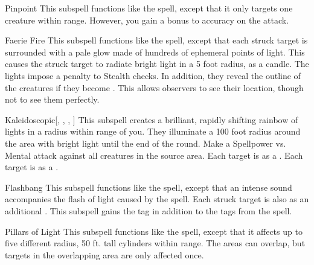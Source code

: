\begin{ability}[\nth{2}]{Pinpoint}
This subspell functions like the  spell, except that it only targets one creature within \rngmed range.
However, you gain a  bonus to accuracy on the attack.
\end{ability}
\vspace{0.25em}


\begin{ability}[\nth{3}]{Faerie Fire}
This subspell functions like the  spell, except that each struck target is surrounded with a pale glow made of hundreds of ephemeral points of light.
This causes the struck target to radiate bright light in a 5 foot radius, as a candle.
The lights impose a  penalty to Stealth checks.
In addition, they reveal the outline of the creatures if they become .
This allows observers to see their location, though not to see them perfectly.
\end{ability}
\vspace{0.25em}


\begin{ability}[\nth{3}]{Kaleidoscopic}[, , , ]
This subspell creates a brilliant, rapidly shifting rainbow of lights in a \areasmall radius within \rngmed range of you.
They illuminate a 100 foot radius around the area with bright light until the end of the round.
Make a Spellpower vs. Mental attack against all creatures in the source area.
\hit Each target is \disoriented as a .
\crit Each target is \confused as a .
\end{ability}
\vspace{0.25em}


\begin{ability}[\nth{4}]{Flashbang}
This subspell functions like the  spell, except that an intense sound accompanies the flash of light caused by the spell.
Each struck target is also  as an additional .
This subspell gains the  tag in addition to the tags from the  spell.
\end{ability}
\vspace{0.25em}


\begin{ability}[\nth{4}]{Pillars of Light}
This subspell functions like the  spell, except that it affects up to five different \areasmall radius, 50 ft. tall cylinders within range.
The areas can overlap, but targets in the overlapping area are only affected once.
\end{ability}
\vspace{0.25em}


